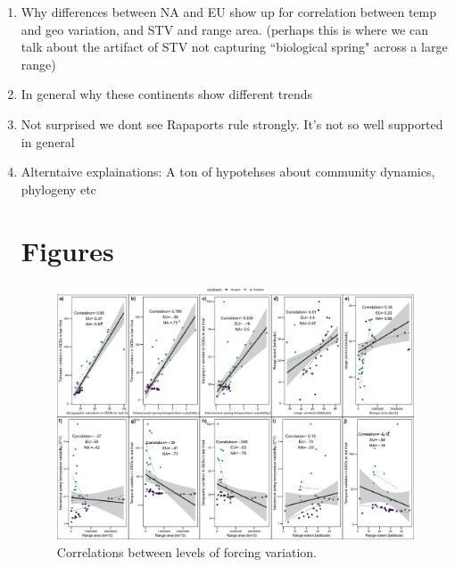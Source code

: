 \documentclass[11pt]{article}\usepackage[]{graphicx}\usepackage[]{color}
\begin{document}
\begin{enumerate}
\item Why differences between NA and EU show up for correlation between temp and geo variation, and STV and range area. (perhaps this is where we can talk about the artifact of STV not capturing ``biological spring" across a large range)
\item In general why these continents show different trends
\item Not surprised we dont see Rapaports rule strongly. It's not so well supported in general \citep{Gaston:1998aa}
\item Alterntaive explainations: A ton of hypotehses about community dynamics, phylogeny etc




\section*{Figures}
\begin{figure}[h!]
    \centering
 \includegraphics[width=\textwidth]{..//..//analyses/ranges/figures/clim_params.jpeg} 
    \caption{Correlations between levels of forcing variation. }
    \label{fig:climcor}
\end{figure}


\end{enumerate}
\end{document}
